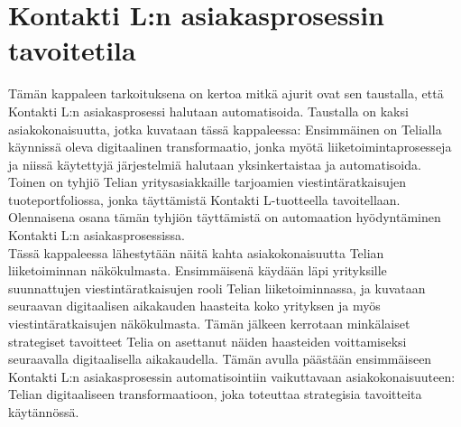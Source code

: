 \documentclass[finnish,12pt,a4paper,pdftex]{article}
\begin{document}




\clearpage

\section{Kontakti L:n asiakasprosessin tavoitetila}

Tämän kappaleen tarkoituksena on kertoa mitkä ajurit ovat sen taustalla, että Kontakti L:n asiakasprosessi halutaan automatisoida. Taustalla on kaksi asiakokonaisuutta, jotka kuvataan tässä kappaleessa: Ensimmäinen on Telialla käynnissä oleva digitaalinen transformaatio, jonka myötä liiketoimintaprosesseja ja niissä käytettyjä järjestelmiä halutaan yksinkertaistaa ja automatisoida. Toinen on tyhjiö Telian yritysasiakkaille tarjoamien viestintäratkaisujen tuoteportfoliossa, jonka täyttämistä Kontakti L-tuotteella tavoitellaan. Olennaisena osana tämän tyhjiön täyttämistä on automaation hyödyntäminen Kontakti L:n asiakasprosessissa.\\

Tässä kappaleessa lähestytään näitä kahta asiakokonaisuutta Telian liiketoiminnan näkökulmasta. Ensimmäisenä käydään läpi yrityksille suunnattujen viestintäratkaisujen rooli Telian liiketoiminnassa, ja kuvataan seuraavan digitaalisen aikakauden haasteita koko yrityksen ja myös viestintäratkaisujen näkökulmasta. Tämän jälkeen kerrotaan minkälaiset strategiset tavoitteet Telia on asettanut näiden haasteiden voittamiseksi seuraavalla digitaalisella aikakaudella. Tämän avulla päästään ensimmäiseen Kontakti L:n asiakasprosessin automatisointiin vaikuttavaan asiakokonaisuuteen: Telian digitaaliseen transformaatioon, joka toteuttaa strategisia tavoitteita käytännössä.\\
\end{document}

